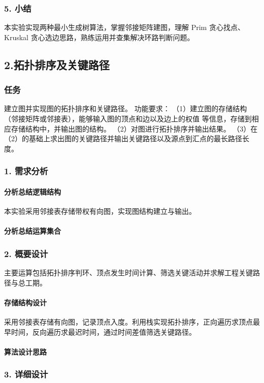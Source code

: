 \documentclass{ctexart}
\begin{document}
\subsubsection{5. 小结}
本实验实现两种最小生成树算法，掌握邻接矩阵建图，理解 Prim 贪心找点、Kruskal 贪心选边思路，熟练运用并查集解决环路判断问题。

\subsection {2.拓扑排序及关键路径}
\subsubsection {任务}
建立图并实现图的拓扑排序和关键路径。 功能要求： （1）建立图的存储结构（邻接矩阵或邻接表），能够输入图的顶点和边以及边上的权值 等信息，存储到相应存储结构中，并输出图的结构。 （2）对图进行拓扑排序并输出结果。 （3）在（2）的基础上求出图的关键路径并输出关键路径以及源点到汇点的最长路径长度。
\subsubsection{1. 需求分析}
\paragraph{分析总结逻辑结构}
本实验采用邻接表存储带权有向图，实现图结构建立与输出。
\paragraph{分析总结运算集合}
\subsubsection{2. 概要设计}
主要运算包括拓扑排序判环、顶点发生时间计算、筛选关键活动并求解工程关键路径与总工期。
\paragraph{存储结构设计}
采用邻接表存储有向图，记录顶点入度。利用栈实现拓扑排序，正向遍历求顶点最早时间，反向遍历求最迟时间，通过时间差值筛选关键路径。
\paragraph{算法设计思路}
\subsubsection{3. 详细设计}
\end{document}
